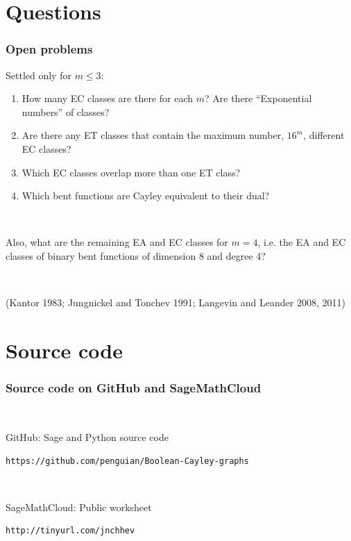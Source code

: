 \documentclass[pdf,sprung,slideColor,nocolorBG]{beamer}
\newenvironment{colortheme}[1]{
\def\ProvidesPackageRCS $##1${\relax}
\renewcommand{\ProcessOptions}{\relax}
\makeatletter

\makeatother
}{}
\newcommand{\slidecite}[1]{\tiny{(#1)}\normalsize{}}
\begin{document}
\begin{colortheme}{jubata}
\section{Questions}
\begin{frame}
\frametitle{Open problems}
Settled only for $m \leqslant 3$:
\begin{enumerate}
\item
How many EC classes are there for each $m$? 
Are there ``Exponential numbers'' of classes? 
\item
Are there any ET classes that contain the maximum number, $16^m$, different EC classes?
\item
Which EC classes overlap more than one ET class?
\item
Which bent functions are Cayley equivalent to their dual?
\end{enumerate}
~

Also, what are the remaining EA and EC classes for $m=4$, 
i.e. the EA and EC classes of binary bent functions of dimension 8 and degree 4?

~

\slidecite{Kantor 1983; Jungnickel and Tonchev 1991; Langevin and Leander 2008, 2011}
\end{frame}
\end{colortheme}
\section{Source code}
\begin{colortheme}{jubata}
\begin{frame}[fragile]
\frametitle{Source code on GitHub and SageMathCloud}
~

GitHub: Sage and Python source code

\begin{verbatim}
https://github.com/penguian/Boolean-Cayley-graphs
\end{verbatim}

~

SageMathCloud: Public worksheet

\begin{verbatim}
http://tinyurl.com/jnchhev
\end{verbatim}
 
\end{frame}
\end{colortheme}
\end{document}
